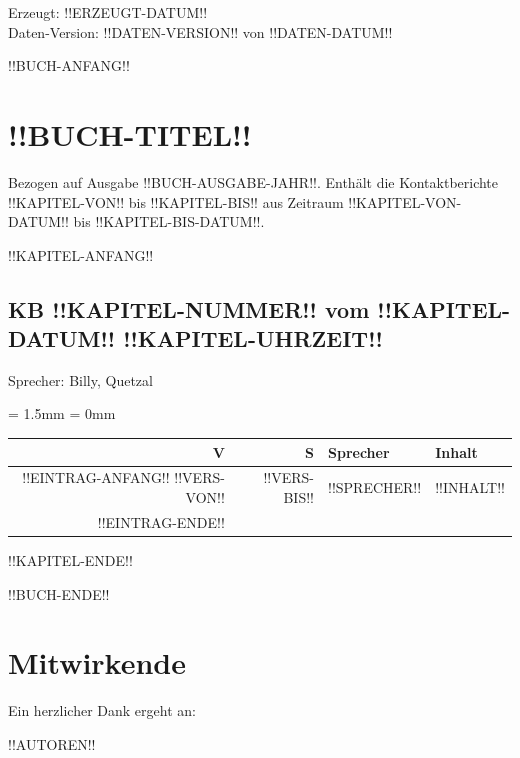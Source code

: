 \documentclass[ngerman,10pt]{book}
\begin{document}
\noindent Erzeugt: !!ERZEUGT-DATUM!! \\
Daten-Version: !!DATEN-VERSION!! von !!DATEN-DATUM!!

\newpage



\tableofcontents



\mainmatter

!!BUCH-ANFANG!!
\chapter*{!!BUCH-TITEL!!}

Bezogen auf Ausgabe !!BUCH-AUSGABE-JAHR!!. Enthält die Kontaktberichte !!KAPITEL-VON!! bis !!KAPITEL-BIS!! aus Zeitraum !!KAPITEL-VON-DATUM!! bis !!KAPITEL-BIS-DATUM!!.



!!KAPITEL-ANFANG!!
\section{KB !!KAPITEL-NUMMER!! vom !!KAPITEL-DATUM!! !!KAPITEL-UHRZEIT!!}

Sprecher: Billy, Quetzal

\tabulinesep = 1.5mm
\extrarowsep = 0mm
\begin{longtabu} to \linewidth {rrlX}


\rowfont\bfseries V & S & Sprecher & Inhalt \\ \hline
\endhead

\hline
\endfoot

\hline
\endlastfoot

!!EINTRAG-ANFANG!!
!!VERS-VON!! & !!VERS-BIS!! & !!SPRECHER!! & !!INHALT!! \\
!!EINTRAG-ENDE!!
\end{longtabu}



!!KAPITEL-ENDE!!



!!BUCH-ENDE!!



\chapter*{Mitwirkende}
\label{ch:mitwirkende}

Ein herzlicher Dank ergeht an:

\noindent !!AUTOREN!!



\printindex
\end{document}
